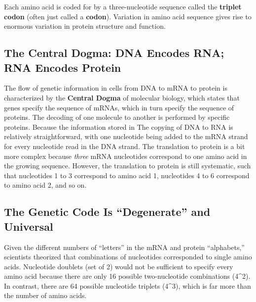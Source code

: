 \documentclass[
]{book}
\begin{document}
Each amino acid is coded for by a three-nucleotide sequence called the \textbf{triplet codon} (often just called a \textbf{codon}). Variation in amino acid sequence gives rise to enormous variation in protein structure and function.

\hypertarget{the-central-dogma-dna-encodes-rna-rna-encodes-protein}{%
\subsection{The Central Dogma: DNA Encodes RNA; RNA Encodes Protein}\label{the-central-dogma-dna-encodes-rna-rna-encodes-protein}}

The flow of genetic information in cells from DNA to mRNA to protein is characterized by the \textbf{Central Dogma} of molecular biology, which states that genes specify the sequence of mRNAs, which in turn specify the sequence of proteins. The decoding of one molecule to another is performed by specific proteins. Because the information stored in
The copying of DNA to RNA is relatively straightforward, with one nucleotide being added to the mRNA strand for every nucleotide read in the DNA strand. The translation to protein is a bit more complex because \emph{three} mRNA nucleotides correspond to one amino acid in the growing sequence. However, the translation to protein is still systematic, such that nucleotides 1 to 3 correspond to amino acid 1, nucleotides 4 to 6 correspond to amino acid 2, and so on.

\hypertarget{the-genetic-code-is-degenerate-and-universal}{%
\subsection{The Genetic Code Is ``Degenerate'' and Universal}\label{the-genetic-code-is-degenerate-and-universal}}

Given the different numbers of ``letters'' in the mRNA and protein ``alphabets,'' scientists theorized that combinations of nucleotides corresponded to single amino acids. Nucleotide doublets (set of 2) would not be sufficient to specify every amino acid because there are only 16 possible two-nucleotide combinations (4\^{}2). In contrast, there are 64 possible nucleotide triplets (4\^{}3), which is far more than the number of amino acids.
\end{document}
